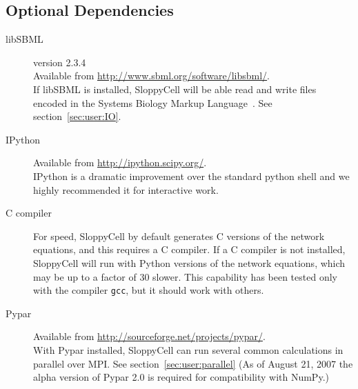 \documentclass[12pt]{article}
\newcommand{\filename}[1]{\texttt{#1}}
\begin{document}
\subsection{Optional Dependencies}

\begin{description}

\item[libSBML] version 2.3.4\\
Available from \url{http://www.sbml.org/software/libsbml/}.\\
If libSBML is installed, SloppyCell will be able read and write files encoded in the Systems Biology Markup Language~\cite{bib:Hucka2003}. See section~\ref{sec:user:IO}.

\item[IPython]
Available from \url{http://ipython.scipy.org/}.\\
IPython is a dramatic improvement over the standard python shell and we highly recommended it for interactive work.

\item[C compiler]
For speed, SloppyCell by default generates C versions of the network equations, and this requires a C compiler. 
If a C compiler is not installed, SloppyCell will run with Python versions of the network equations, which may be up to a factor of 30 slower. 
This capability has been tested only with the compiler \filename{gcc}, but it should work with others.

\item[Pypar]
Available from \url{http://sourceforge.net/projects/pypar/}.\\
With Pypar installed, SloppyCell can run several common calculations in parallel over MPI. See section~\ref{sec:user:parallel}
(As of August 21, 2007 the alpha version of Pypar 2.0 is required for compatibility with NumPy.)


\end{description}
\end{document}
